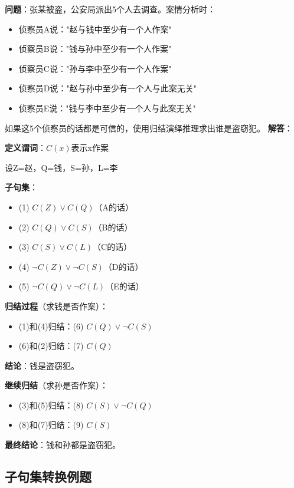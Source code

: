 \begin{examplebox}
\textbf{问题}：张某被盗，公安局派出5个人去调查。案情分析时：
\begin{itemize}[itemsep=0pt]
    \item 侦察员A说："赵与钱中至少有一个人作案"
    \item 侦察员B说："钱与孙中至少有一个人作案"
    \item 侦察员C说："孙与李中至少有一个人作案"
    \item 侦察员D说："赵与孙中至少有一个人与此案无关"
    \item 侦察员E说："钱与李中至少有一个人与此案无关"
\end{itemize}
如果这5个侦察员的话都是可信的，使用归结演绎推理求出谁是盗窃犯。
\tcblower
\textbf{解答}：

\textbf{定义谓词}：$C(x)$表示x作案

设Z=赵，Q=钱，S=孙，L=李

\textbf{子句集}：
\begin{itemize}[itemsep=0pt]
    \item (1) $C(Z) \lor C(Q)$（A的话）
    \item (2) $C(Q) \lor C(S)$（B的话）
    \item (3) $C(S) \lor C(L)$（C的话）
    \item (4) $\neg C(Z) \lor \neg C(S)$（D的话）
    \item (5) $\neg C(Q) \lor \neg C(L)$（E的话）
\end{itemize}

\textbf{归结过程}（求钱是否作案）：
\begin{itemize}[itemsep=0pt]
    \item (1)和(4)归结：(6) $C(Q) \lor \neg C(S)$
    \item (6)和(2)归结：(7) $C(Q)$
\end{itemize}

\textbf{结论}：钱是盗窃犯。

\textbf{继续归结}（求孙是否作案）：
\begin{itemize}[itemsep=0pt]
    \item (3)和(5)归结：(8) $C(S) \lor \neg C(Q)$
    \item (8)和(7)归结：(9) $C(S)$
\end{itemize}

\textbf{最终结论}：钱和孙都是盗窃犯。
\end{examplebox}

\subsection{子句集转换例题}

